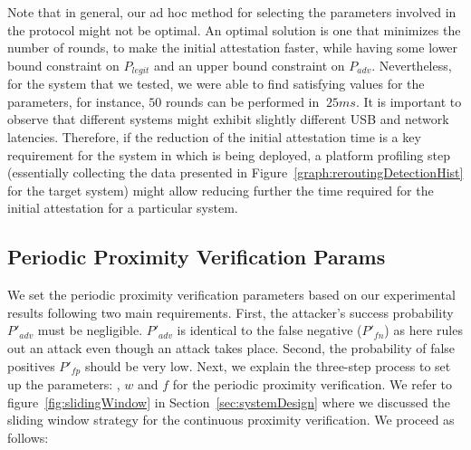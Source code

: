 \ifusenix
\vspace{-10pt}
\else
\fi
{}
Note that in general, our ad hoc method for selecting the parameters involved in the protocol might not be optimal. An optimal solution is one that minimizes the number of rounds, to make the initial attestation faster, while having some lower bound constraint on $P_{legit}$ and an upper bound constraint on $P_{adv}$. Nevertheless, for the system that we tested, we were able to find satisfying values for the parameters, for instance, $50$ rounds can be performed in $~25 ms$.
It is important to observe that different systems might exhibit slightly different USB and network latencies. Therefore, if the reduction of the initial attestation time is a key requirement for the system in which \device is being deployed, a platform profiling step (essentially collecting the data presented in Figure~\ref{graph:reroutingDetectionHist} for the target system) might allow reducing further the time required for the initial attestation for a particular system.


\subsection{Periodic Proximity Verification Params}
\label{sec:evaluationL:continuousParameters}


We set the periodic proximity verification parameters based on our experimental results following two main requirements. First, the attacker's success probability $P'_{adv}$ must be negligible. $P'_{adv}$ is identical to the false negative ($P'_{fn}$) as here \name rules out an attack even though an attack takes place. Second, the probability of false positives $P'_{fp}$ should be very low. Next, we explain the three-step process to set up the parameters: \detach, $w$ and $f$ for the periodic proximity verification. We refer to figure~\ref{fig:slidingWindow} in Section~\ref{sec:systemDesign} where we discussed the sliding window strategy for the continuous proximity verification. We proceed as follows:


